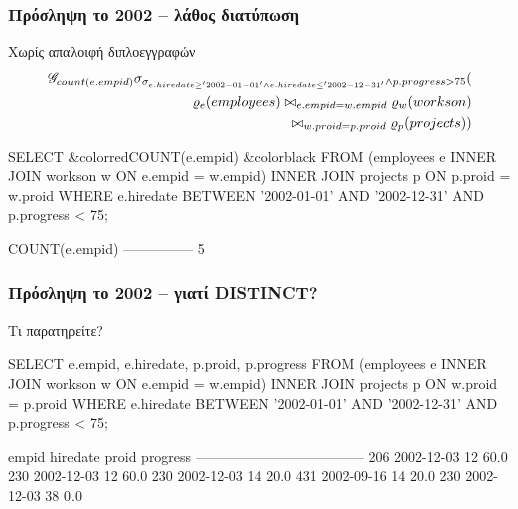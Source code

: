 \begin{frame}
\frametitle{Πρόσληψη το 2002 -- λάθος διατύπωση}
\begin{minipage}{\wE}
\vspace{-0.55cm}
\begin{alertblock}{\small Χωρίς απαλοιφή διπλοεγγραφών}
\vspace{-0.55cm}
\[
\begin{split}
    {}_{} \mathscr{G}_{count(e.empid)}
      \sigma_{\sigma_{e.hiredate\geq'2002-01-01'\wedge e.hiredate\leq'2002-12-31'}
                      \wedge p.progress>75}
      (                           \\
        \varrho_{e} (employees) \bowtie_{e.empid=w.empid} \varrho_{w} (workson)   \\
                                \bowtie_{w.proid=p.proid} \varrho_{p} (projects)
      )
\end{split}
\]
\pause
\vspace{-0.55cm}
\en
\begin{SQL}
  SELECT &color{red}COUNT(e.empid) &color{black}
    FROM (employees e INNER JOIN workson  w
                         ON e.empid = w.empid)
                      INNER JOIN projects p
                         ON p.proid = w.proid
   WHERE e.hiredate BETWEEN '2002-01-01' AND '2002-12-31'
     AND p.progress < 75;

 COUNT(e.empid)
---------------
              5
\end{SQL}
\el
\end{alertblock}
\end{minipage}
\end{frame}


\begin{frame}
\frametitle{Πρόσληψη το 2002 -- γιατί {\en DISTINCT}?}
\begin{minipage}{\wE}
\vspace{-0.55cm}
\begin{block}{\small Τι παρατηρείτε?}
\en
\begin{SQL}
  SELECT e.empid, e.hiredate, p.proid, p.progress
    FROM (employees e INNER JOIN workson  w
                         ON e.empid = w.empid)
                      INNER JOIN projects p
                         ON w.proid = p.proid
   WHERE e.hiredate BETWEEN '2002-01-01' AND '2002-12-31'
     AND p.progress < 75;

 empid  hiredate    proid  progress
------------------------------------
   206  2002-12-03     12      60.0
   230  2002-12-03     12      60.0
   230  2002-12-03     14      20.0
   431  2002-09-16     14      20.0
   230  2002-12-03     38       0.0
\end{SQL}
\el
\end{block}
\end{minipage}
\end{frame}


